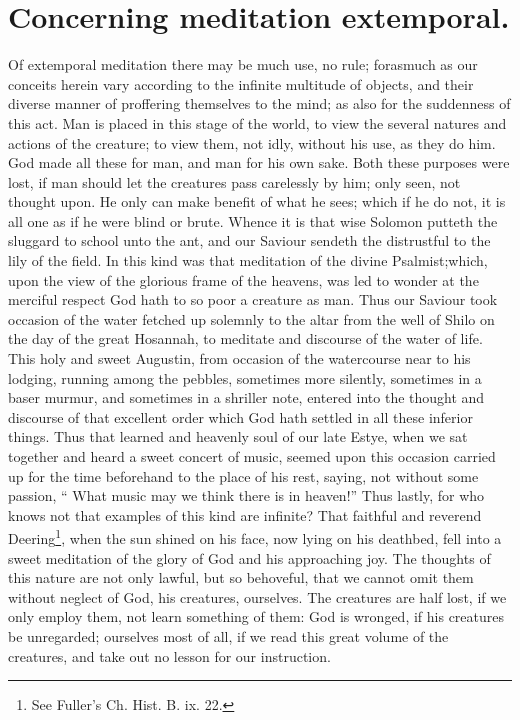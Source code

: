 \section{Concerning meditation extemporal.}
Of extemporal meditation there may be much use, no rule; forasmuch as our conceits herein vary according to the infinite multitude of objects, and their diverse manner of proffering themselves to the mind; as also for the suddenness of this act. Man is placed in this stage of the world, to view the several natures and actions of the creature; to view them, not idly, without his use, as they do him. God made all these for man, and man for his own sake. Both these purposes were lost, if man should let the creatures pass carelessly by him; only seen, not thought upon. He only can make benefit of what he sees; which if he do not, it is all one as if he were blind or brute. Whence it is that wise Solomon putteth the sluggard to school unto the ant, and our Saviour sendeth the distrustful to the lily of the field. In this kind was that meditation of the divine Psalmist;which, upon the view of the glorious frame of the heavens, was led to wonder at the merciful respect God hath to so poor a creature as man. Thus our Saviour took occasion of the water fetched up solemnly to the altar from the well of Shilo on the day of the great Hosannah, to meditate and discourse of the water of life. This holy and sweet Augustin, from occasion of the watercourse near to his lodging, running among the pebbles, sometimes more silently, sometimes in a baser murmur, and sometimes in a shriller note, entered into the thought and discourse of that excellent order which God hath settled in all these inferior things. Thus that learned and heavenly soul of our late Estye, when we sat together and heard a sweet concert of music, seemed upon this occasion carried up for the time beforehand to the place of his rest, saying, not without some passion, `` What music may we think there is in heaven!'' Thus lastly, for who knows not that examples of this kind are infinite? That faithful and reverend Deering\footnote{See Fuller's Ch. Hist. B. ix. 22.}, when the sun shined on his face, now lying on his deathbed, fell into a sweet meditation of the glory of God and his approaching joy. The thoughts of this nature are not only lawful, but so behoveful, that we cannot omit them without neglect of God, his creatures, ourselves. The creatures are half lost, if we only employ them, not learn something of them: God is wronged, if his creatures be unregarded; ourselves most of all, if we read this great volume of the creatures, and take out no lesson for our instruction. 


